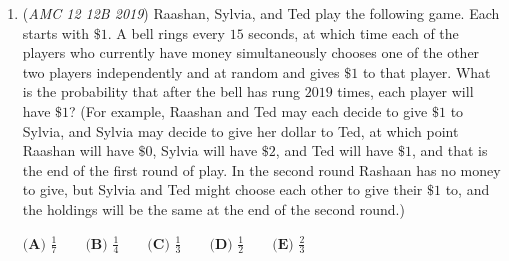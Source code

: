 \begin{enumerate}
 



\textbf{Solution 3 (geometry)}

By the Pythagorean Theorem, we can calculate $EB=ED=3\sqrt{5},EC=3\sqrt{6},ER= \sqrt{6},$ and $EP=EQ=2 \sqrt{5}$. Now by the Law of Cosines in $\triangle BEC$, we have$\cos{\left(\angle BEC\right)}=\frac{EB^2+EC^2-BC^2}{2 \cdot EB \cdot EC}=\frac{5}{\sqrt{30}}$.

 Similarly, by the Law of Cosines in $\triangle EPR$, we have$PR^2=ER^2+EP^2-2 \cdot ER \cdot EP \cdot \cos{\left(\angle BEC\right)}=6$, so $PR=\sqrt{6}$. Observe that $\triangle ERP \cong \triangle ERQ$ (by \textit{side-angle-side}), so $QR=PR=\sqrt{6}$.

 Next, notice that $PQ$ is parallel to $DB$, and therefore $\triangle EQP$ is similiar to $\triangle EDB$. Thus we have $\frac{QP}{DB}=\frac{EP}{EB}=\frac{2}{3}$. Since $DB=3\sqrt{2}$, this gives $PQ=2 \sqrt{2}$.

 Now we have the three side lengths of isosceles $\triangle PQR$: $PR=QR=\sqrt{6}$, $PQ=2 \sqrt{2}$. Letting the midpoint of $PQ$ be $S$, $RS$ is the perpendicular bisector of $PQ$, and so can be used as a height of $\triangle PQR$ (taking $PQ$ as the base). Using the Pythagorean Theorem again, we have $RS=\sqrt{PR^2-PS^2}=2$, so the area of $\triangle PQR$ is $\frac{1}{2} \cdot PQ \cdot RS = \frac{1}{2} \cdot 2\sqrt{2} \cdot 2 = \boxed{\textbf{(C) } 2 \sqrt{2}}$.

 


	\item (\textit{AMC 12 12B 2019}) Raashan, Sylvia, and Ted play the following game. Each starts with $\$1$. A bell rings every $15$ seconds, at which time each of the players who currently have money simultaneously chooses one of the other two players independently and at random and gives $\$1$ to that player. What is the probability that after the bell has rung $2019$ times, each player will have $\$1$? (For example, Raashan and Ted may each decide to give $\$1$ to Sylvia, and Sylvia may decide to give her dollar to Ted, at which point Raashan will have $\$0$, Sylvia will have $\$2$, and Ted will have $\$1$, and that is the end of the first round of play. In the second round Rashaan has no money to give, but Sylvia and Ted might choose each other to give their $\$1$ to, and the holdings will be the same at the end of the second round.)


 $\textbf{(A) } \frac{1}{7} \qquad\textbf{(B) } \frac{1}{4} \qquad\textbf{(C) } \frac{1}{3} \qquad\textbf{(D) } \frac{1}{2} \qquad\textbf{(E) } \frac{2}{3}$


\end{enumerate}
